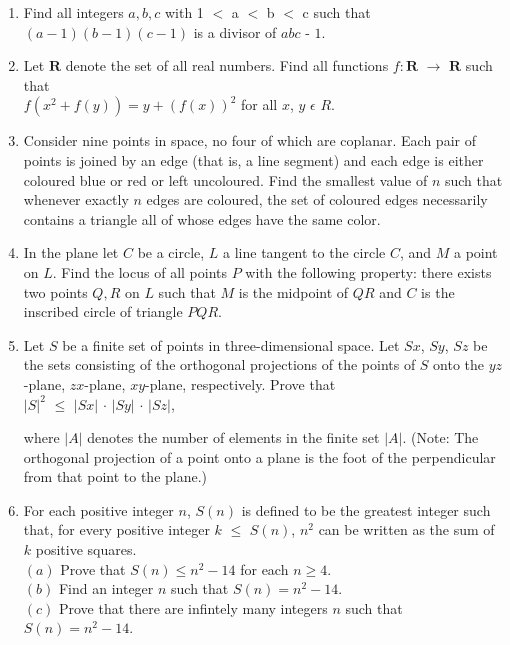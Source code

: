 \documentclass[12pt,-letter paper]{article}
\providecommand{\brak}[1]{\ensuremath{\left(#1\right)}}
\begin{document}
\begin{enumerate}

\item  Find all integers $a,b,c$ with 1 $<$ a $<$ b $<$ c such that\\
$(a-1)(b-1)(c-1)$ is a divisor of $abc$ - $1$.

\item Let $\textbf{R}$ denote the set of all real numbers. Find all functions $f : \textbf{R}$ $\rightarrow$ $\textbf{R}$ such that\\
$f(x^{2}+f(y))=y+(f(x))^{2}$ for all $x$, $y$ $\epsilon$ $R$.

\item Consider nine points in space, no four of which are coplanar. Each pair of points is joined by an edge (that is, a line segment) and each edge is either coloured blue or red or left uncoloured. Find the smallest value of $n$ such that whenever exactly $n$ edges are coloured, the set of coloured edges necessarily contains a triangle all of whose edges have the same color.

\item In the plane let $C$ be a circle, $L$ a line tangent to the circle $C$, and $M$ a point on $L$. Find the locus of all points $P$ with the following property: there exists two points $Q,R$ on $L$ such that $M$ is the midpoint of $QR$ and $C$ is the inscribed circle of triangle $PQR$.

\item Let $S$ be a finite set of points in three-dimensional space. Let $Sx$, $Sy$, $Sz$ be the sets consisting of the orthogonal projections of the points of $S$ onto the $yz$-plane, $zx$-plane, $xy$-plane, respectively. Prove that\\
$|S|^{2}$ $\leq$ $|Sx|$ $\cdot$ $|Sy|$ $\cdot$ $|Sz|$,

where $|A|$ denotes the number of elements in the finite set $|A|$. (Note: The orthogonal projection of a point onto a plane is the foot of the perpendicular from that point to the plane.)

\item For each positive integer $n$, $S(n)$ is defined to be the greatest integer such that, for every positive integer $k$ $\leq$ $S(n)$, $n^{2}$ can be written as the sum of $k$ positive squares. \\
$\brak a$ Prove that $S(n) \leq n^{2} - 14$ for each $n \geq 4$.\\
$\brak b$ Find an integer $n$ such that $S(n) = n^{2} - 14$. \\
$\brak c$ Prove that there are infintely many integers $n$ such that $S(n) = {n^{2}}-14$.

\end{enumerate}
\end{document}
